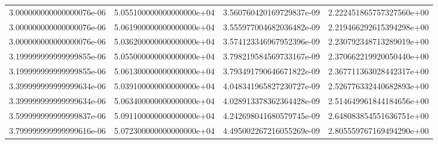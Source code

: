 \begin{table}
\begin{tabular}{S[scientific-notation=fixed,fixed-exponent = -6 ]@{\qquad} S[scientific-notation=fixed,fixed-exponent = 0, round-precision=0 ] S S[scientific-notation=fixed,fixed-exponent =0 ]}
  3.000000000000000076e-06 & 5.055100000000000000e+04 & 3.560760420169729837e-09 & 2.222451865757327560e+00\\
  3.000000000000000076e-06 & 5.061900000000000000e+04 & 3.555977004682036482e-09 & 2.219466292615394298e+00\\
  3.000000000000000076e-06 & 5.036200000000000000e+04 & 3.574123346967952396e-09 & 2.230792348713289019e+00\\
  3.199999999999999855e-06 & 5.055000000000000000e+04 & 3.798219584569733167e-09 & 2.370662219920050440e+00\\
  3.199999999999999855e-06 & 5.061300000000000000e+04 & 3.793491790646671822e-09 & 2.367711363028442317e+00\\
  3.399999999999999634e-06 & 5.039100000000000000e+04 & 4.048341965827230727e-09 & 2.526776332440682893e+00\\
  3.399999999999999634e-06 & 5.063400000000000000e+04 & 4.028913378362364428e-09 & 2.514649961844184656e+00\\
  3.599999999999999837e-06 & 5.091100000000000000e+04 & 4.242698041680579745e-09 & 2.648083854551636751e+00\\
  3.799999999999999616e-06 & 5.072300000000000000e+04 & 4.495002267216055269e-09 & 2.805559767169494290e+00\\
  \bottomrule
\end{tabular}
\label{tab:e2}
\end{table}




















%
